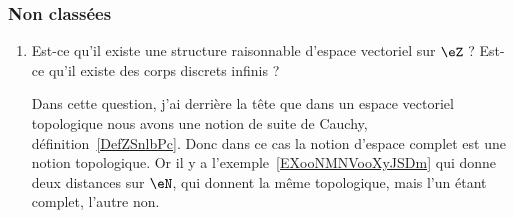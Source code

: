 \subsubsection{Non classées}

\begin{enumerate}
    \item
        Est-ce qu'il existe une structure raisonnable d'espace vectoriel sur \( \eZ\) ? Est-ce qu'il existe des corps discrets infinis ?

        Dans cette question, j'ai derrière la tête que dans un espace vectoriel topologique nous avons une notion de suite de Cauchy, définition~\ref{DefZSnlbPc}. Donc dans ce cas la notion d'espace complet est une notion topologique. Or il y a l'exemple~\ref{EXooNMNVooXyJSDm} qui donne deux distances sur \( \eN\), qui donnent la même topologique, mais l'un étant complet, l'autre non.


\end{enumerate}
